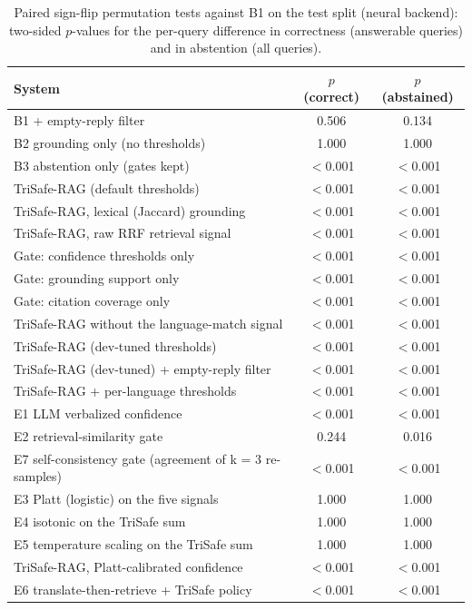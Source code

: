 \begin{table}[t]
  \caption{Paired sign-flip permutation tests against B1 on the test split (neural backend): two-sided $p$-values for the per-query difference in correctness (answerable queries) and in abstention (all queries).}
  \label{tab:tests-neural}
  \footnotesize
  \begin{tabular}{lcc}
    \toprule
    System & $p$ (correct) & $p$ (abstained) \\
    \midrule
    B1 + empty-reply filter & 0.506 & 0.134 \\
    B2 grounding only (no thresholds) & 1.000 & 1.000 \\
    B3 abstention only (gates kept) & $<$0.001 & $<$0.001 \\
    TriSafe-RAG (default thresholds) & $<$0.001 & $<$0.001 \\
    TriSafe-RAG, lexical (Jaccard) grounding & $<$0.001 & $<$0.001 \\
    TriSafe-RAG, raw RRF retrieval signal & $<$0.001 & $<$0.001 \\
    Gate: confidence thresholds only & $<$0.001 & $<$0.001 \\
    Gate: grounding support only & $<$0.001 & $<$0.001 \\
    Gate: citation coverage only & $<$0.001 & $<$0.001 \\
    TriSafe-RAG without the language-match signal & $<$0.001 & $<$0.001 \\
    TriSafe-RAG (dev-tuned thresholds) & $<$0.001 & $<$0.001 \\
    TriSafe-RAG (dev-tuned) + empty-reply filter & $<$0.001 & $<$0.001 \\
    TriSafe-RAG + per-language thresholds & $<$0.001 & $<$0.001 \\
    E1 LLM verbalized confidence & $<$0.001 & $<$0.001 \\
    E2 retrieval-similarity gate & 0.244 & 0.016 \\
    E7 self-consistency gate (agreement of k = 3 re-samples) & $<$0.001 & $<$0.001 \\
    E3 Platt (logistic) on the five signals & 1.000 & 1.000 \\
    E4 isotonic on the TriSafe sum & 1.000 & 1.000 \\
    E5 temperature scaling on the TriSafe sum & 1.000 & 1.000 \\
    TriSafe-RAG, Platt-calibrated confidence & $<$0.001 & $<$0.001 \\
    E6 translate-then-retrieve + TriSafe policy & $<$0.001 & $<$0.001 \\
    \bottomrule
  \end{tabular}
\end{table}
